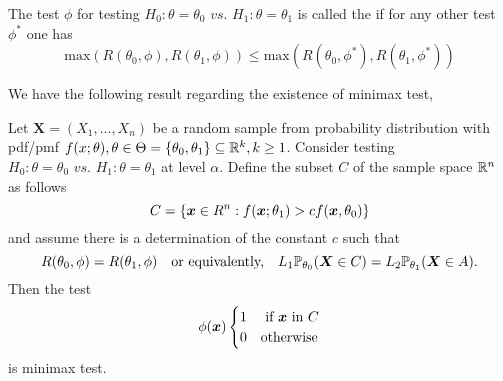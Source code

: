\begin{definition}
    The test $\phi$ for testing 
    $H_0: \theta = \theta_0 \textit{ vs. } H_1: \theta = \theta_1$ 
    is called the  if for any other test $\phi^*$ one has 
    $$
    \text{max}(R(\theta_0,\phi),R(\theta_1,\phi)) \leq 
    \text{max}(R(\theta_0,\phi^*),R(\theta_1,\phi^*))
    $$
\end{definition}
We have the following result regarding the existence of minimax test,

\begin{theorem}
    Let $\boldsymbol{X} = (X_1,...,X_n)$ be a random sample from probability distribution with pdf/pmf $f(x;\theta), \theta \in \Theta = \{\theta_0,\theta_1 \} \subseteq \mathbb R^{k}, k \geq 1$.
    Consider testing $H_0: \theta = \theta_0 \textit{ vs. } H_1: \theta = \theta_1$ at level $\alpha$. 
    Define the subset $C$ of the sample space $\mathbb R^n$ as follows
    $$
    C = \left\{ 
    \boldsymbol{x} \in R^n : f(\boldsymbol{x};\theta_1) > cf(\boldsymbol{x}, \theta_0)
    \right\}
    $$
    and assume there is a determination of the constant $c$ such that 
    $$
    R(\theta_0,\phi) = R(\theta_1,\phi) \quad \text{or equivalently,} \quad
    L_1\mathbb P_{\theta_0}(\boldsymbol{X} \in C) = L_2\mathbb P_{\theta_1}(\boldsymbol{X} \in A).
    $$
    Then the test 
    $$
    \phi(\boldsymbol{x})
    \begin{cases}
    1 & \text{ if } \boldsymbol{x} \text{ in } C \\
    0 & \text{otherwise}
    \end{cases}
    $$
    is minimax test.
\end{theorem}